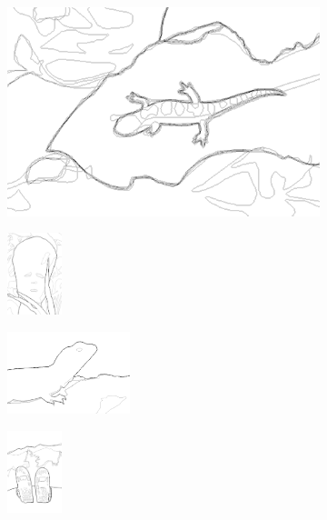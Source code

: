 \documentclass[journal]{IEEEtran}
\begin{document}
\begin{figure}[!ht]
    \begin{subfigure}[t]{\textwidth+20pt\relax}
    	\centering
    	\includegraphics[width=\dimexpr\linewidth-20pt\relax]{175083_gt_grad} 
    \end{subfigure}      
    \begin{subfigure}[b]{0.23\textwidth}
    	\centering
        \includegraphics[height=67.68857pt]{101084_gt_grad}
    \end{subfigure}
    \begin{subfigure}[b]{0.23\textwidth}
    	\centering
        \includegraphics[height=67.68857pt]{41096_gt_grad}
    \end{subfigure}
    \begin{subfigure}[b]{0.23\textwidth}
    	\centering
        \includegraphics[height=67.68857pt]{2018_gt_grad}
    \end{subfigure} \\ \vspace{-5pt}   
    

\end{figure}
\end{document}
